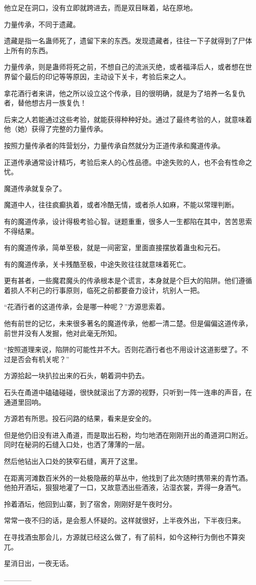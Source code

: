 \begin{this_body}
他立足在洞口，没有立即就跨进去，而是双目眯着，站在原地。

力量传承，不同于遗藏。

遗藏是指一名蛊师死了，遗留下来的东西。发现遗藏者，往往一下子就得到了尸体上所有的东西。

力量传承，则是蛊师将死之前，不想自己的流派灭绝，或者福泽后人，或者想在世界留个最后的印记等等原因，主动设下关卡，考验后来之人。

拿花酒行者来讲，他之所以设立这个传承，目的很明确，就是为了培养一名复仇者，替他想古月一族复仇！

后来之人若能通过这些考验，就能获得种种好处。通过了最终考验的人，就意味着他（她）获得了完整的力量传承。

按照力量传承者的阵营划分，力量传承自然就分为正道传承和魔道传承。

正道传承通常设计精巧，考验后来人的心性品德。中途失败的人，也不会有性命之忧。

魔道传承就复杂了。

魔道中人，往往疯癫执着，或者冷酷无情，或者杀人如麻，不能以常理判断。

有的魔道传承，设计得极考验心智。谜题重重，很多人一生都陷在其中，苦苦思索不得结果。

有的魔道传承，简单至极，就是一间密室，里面直接摆放着蛊虫和元石。

有的魔道传承，关卡残酷至极，中途失败往往就意味着死亡。

更有甚者，一些魔君魔头的传承根本是个谎言，本身就是个巨大的陷阱。他们遵循着损人不利己的行事原则，临死之前都要奋力设计，坑别人一把。

“花酒行者的这道传承，会是哪一种呢？”方源思索着。

他有前世的记忆，未来很多著名的魔道传承，他都一清二楚。但是偏偏这道传承，前世并没有人发掘，他对此毫无所知。

“按照道理来说，陷阱的可能性并不大。否则花酒行者也不用设计这道影壁了。不过是否会有机关呢？”

方源拾起一块扒拉出来的石头，朝着洞中扔去。

石头在甬道中磕磕碰碰，很快就滚出了方源的视野，只听到一阵一连串的声音，在通道里回响。

方源若有所思。投石问路的结果，看来是安全的。

但是他仍旧没有进入甬道，而是取出石粉，均匀地洒在刚刚开出的甬道洞口附近。同时在秘洞的石缝入口处，也洒了薄薄的一层。

然后他钻出入口处的狭窄石缝，离开了这里。

在距离河滩数百米外的一处极隐蔽的草丛中，他找到了此次随时携带来的青竹酒。他拍开酒坛，狠狠地灌了一口，又故意洒出些酒液，沾湿衣裳，弄得一身酒气。

拎着酒坛，他回到山寨，到了宿舍，刚刚好是午夜时分。

常常一夜不归的话，是会惹人怀疑的。这样就很好，上半夜外出，下半夜归来。

在寻找酒虫那会儿，方源就已经这么做了，有了前科，如今这种行为倒也不算突兀。

星消日出，一夜无话。

------------

\end{this_body}

